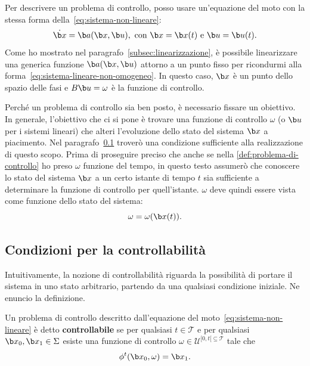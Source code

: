 Per descrivere un problema di controllo, posso usare un'equazione del moto con la stessa forma
della~\eqref{eq:sistema-non-lineare}:
\begin{equation*}
    \dot {\b x} = \b a(\b x, \b u),\ \text{con } \b x = \b x(t)\ \text e\ \b u = \b u(t).
\end{equation*}
Come ho mostrato nel paragrafo~\ref{subsec:linearizzazione}, è possibile linearizzare
una generica funzione $\b a(\b x, \b u)$ attorno a un punto fisso per ricondurmi alla
forma~\eqref{eq:sistema-lineare-non-omogeneo}.
In questo caso, $\b x$ è un punto dello spazio delle fasi e $B\b u = \omega$ è la funzione
di controllo.

Perché un problema di controllo sia ben posto, è necessario fissare un obiettivo.
In generale, l'obiettivo che ci si pone è trovare una funzione di controllo $\omega$
(o $\b u$ per i sistemi lineari) che alteri l'evoluzione dello stato del sistema $\b x$ a piacimento.
Nel paragrafo~\ref{subsec:condizioni-controllabilità} troverò una condizione sufficiente
alla realizzazione di questo scopo.
Prima di proseguire preciso che anche se nella \autoref{def:problema-di-controllo}
ho preso $\omega$ funzione del tempo,
in questo testo assumerò che conoscere lo stato del sistema $\b x$
a un certo istante di tempo $t$ sia sufficiente a determinare la funzione di controllo
per quell'istante. $\omega$ deve quindi essere vista come funzione dello stato
del sistema:
\begin{equation*}
    \omega = \omega(\b x(t)).
\end{equation*}

\subsection{Condizioni per la controllabilità}
\label{subsec:condizioni-controllabilità}
Intuitivamente, la nozione di controllabilità riguarda la possibilità di portare il sistema
in uno stato arbitrario, partendo da una qualsiasi condizione iniziale.
Ne enuncio la definizione.
\begin{definition}
    Un problema di controllo descritto dall'equazione del moto~\eqref{eq:sistema-non-lineare}
    è detto \textbf{controllabile} se per qualsiasi $t \in \mathcal T$ e per qualsiasi $\b x_0, \b x_1 \in \Sigma$
    esiste una funzione di controllo $\omega \in  \mathcal U^{[0, t[ \subseteq \mathcal T}$ tale che
    \begin{equation*}
        \phi^t(\b x_0, \omega) = \b x_1.
    \end{equation*}
    \label{def:controllabilità}
\end{definition}

